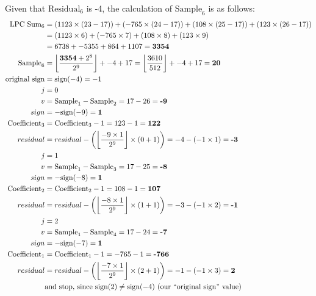 Given that $\text{Residual}_6$ is -4, the calculation of $\text{Sample}_6$
is as follows:
\begin{align*}
\text{LPC Sum}_6 &= (1123 \times (23 - 17)) + (-765 \times (24 - 17)) + (108 \times (25 - 17)) + (123 \times (26 - 17)) \\
&= (1123 \times 6) + (-765 \times 7) + (108 \times 8) + (123 \times 9) \\
&= 6738 + -5355 + 864 + 1107 = \textbf{3354} \\
\text{Sample}_6 &= \left\lfloor\frac{\textbf{3354} + 2^8}{2^9}\right\rfloor + -4 + 17 = \left\lfloor\frac{3610}{512}\right\rfloor + -4 + 17 = \textbf{20} \\
\text{original sign} &= \text{sign}(-4) = -1 \\
j &= 0 \\
v &= \text{Sample}_1 - \text{Sample}_2 = 17 - 26 = \textbf{-9} \\
sign &= -\text{sign}(-9) = \textbf{1} \\
\text{Coefficient}_3 &= \text{Coefficient}_3 - 1 = 123 - 1 = \textbf{122} \\
residual &= residual - \left( \left\lfloor\frac{-9 \times 1}{2 ^ 9}\right\rfloor \times (0 + 1)\right) = -4 - (-1 \times 1) = \textbf{-3} \\
j &= 1 \\
v &= \text{Sample}_1 - \text{Sample}_3 = 17 - 25 = \textbf{-8} \\
sign &= -\text{sign}(-8) = \textbf{1} \\
\text{Coefficient}_2 &= \text{Coefficient}_2 - 1 = 108 - 1 = \textbf{107} \\
residual &= residual - \left( \left\lfloor\frac{-8 \times 1}{2 ^ 9}\right\rfloor \times (1 + 1)\right) = -3 - (-1 \times 2) = \textbf{-1} \\
j &= 2 \\
v &= \text{Sample}_1 - \text{Sample}_4 = 17 - 24 = \textbf{-7} \\
sign &= -\text{sign}(-7) = \textbf{1} \\
\text{Coefficient}_1 &= \text{Coefficient}_1 - 1 = -765 - 1 = \textbf{-766} \\
residual &= residual - \left( \left\lfloor\frac{-7 \times 1}{2 ^ 9}\right\rfloor \times (2 + 1)\right) = -1 - (-1 \times 3) = \textbf{2} \\
&\text{and stop, since sign}(2) \neq \text{sign}(-4) \text{ (our ``{original sign}'' value)}
\end{align*}

